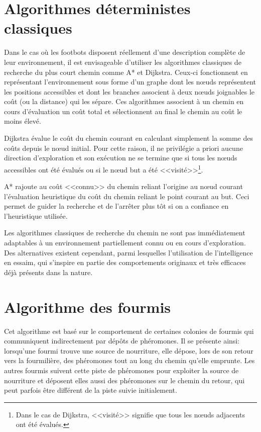 \section{Algorithmes déterministes classiques}

Dans le cas où les footbots disposent réellement d'une description complète de leur environnement, il est envisageable d'utiliser les algorithmes classiques de recherche du plus court chemin comme A* et Dijkstra. Ceux-ci fonctionnent en représentant l'environnement sous forme d'un graphe dont les n\oe{}uds représentent les positions accessibles et dont les branches associent à deux n\oe{}uds joignables le coût (ou la distance) qui les sépare. Ces algorithmes associent à un chemin en cours d'évaluation un coût total et sélectionnent au final le chemin au coût le moins élevé.

Dijkstra évalue le coût du chemin courant en calculant simplement la somme des coûts depuis le n\oe{}ud initial. Pour cette raison, il ne privilégie a priori aucune direction d'exploration et son exécution ne se termine que si tous les n\oe{}uds accessibles ont été évalués ou si le n\oe{}ud but a été <<visité>>\footnote{Dans le cas de Dijkstra, <<visité>> signifie que tous les n\oe{}uds adjacents ont été évalués.}.

A* rajoute au coût <<connu>> du chemin reliant l'origine au n\oe{}ud courant l'évaluation heuristique du coût du chemin reliant le point courant au but. Ceci permet de guider la recherche et de l'arrêter plus tôt si on a confiance en l'heuristique utilisée.~\cite{mehlhorn_shortest_2008,genetic2007}

Les algorithmes classiques de recherche du chemin ne sont pas immédiatement adaptables à un environnement partiellement connu ou en cours d'exploration. Des alternatives existent cependant, parmi lesquelles l'utilisation de l'intelligence en essaim, qui s'inspire en partie  des comportements originaux et très efficaces déjà présents dans la nature.

\section{Algorithme des fourmis}

Cet algorithme est basé sur le comportement de certaines colonies de fourmis qui communiquent indirectement par dépôts de phéromones. Il se présente ainsi: lorsqu'une fourmi trouve une source de nourriture, elle dépose, lors de son retour vers la fourmilière, des phéromones tout au long du chemin qu'elle emprunte. Les autres fourmis suivent cette piste de phéromones pour exploiter la source de nourriture et déposent elles aussi des phéromones sur le chemin du retour, qui peut parfois être différent de la piste suivie initialement.

